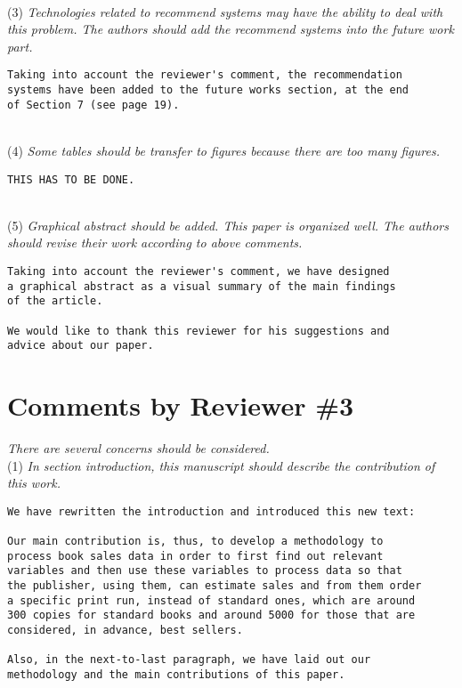 \documentclass[preprint]{elsarticle}
\begin{document}
~\\
\noindent (3) \emph{Technologies related to recommend systems may have the ability to deal with this problem. The authors should add the recommend systems into the future work part. } 

\begin{verbatim}
Taking into account the reviewer's comment, the recommendation 
systems have been added to the future works section, at the end 
of Section 7 (see page 19).
\end{verbatim}
~\\
\noindent (4) \emph{Some tables should be transfer to figures because there are too many figures. } 

\begin{verbatim}
THIS HAS TO BE DONE.
\end{verbatim}

~\\
\noindent (5) \emph{Graphical abstract should be added. This paper is organized well. The authors should revise their work according to above comments. } 

\begin{verbatim}
Taking into account the reviewer's comment, we have designed 
a graphical abstract as a visual summary of the main findings 
of the article.

We would like to thank this reviewer for his suggestions and 
advice about our paper.
\end{verbatim}



\section{Comments by Reviewer \#3}

\noindent \emph{There are several concerns should be considered.}\\

\noindent (1) \emph{In section introduction, this manuscript should describe the contribution of this work. } 

\begin{verbatim}
We have rewritten the introduction and introduced this new text:

Our main contribution is, thus, to develop a methodology to 
process book sales data in order to first find out relevant 
variables and then use these variables to process data so that 
the publisher, using them, can estimate sales and from them order 
a specific print run, instead of standard ones, which are around 
300 copies for standard books and around 5000 for those that are 
considered, in advance, best sellers.

Also, in the next-to-last paragraph, we have laid out our 
methodology and the main contributions of this paper.
\end{verbatim}
\end{document}
